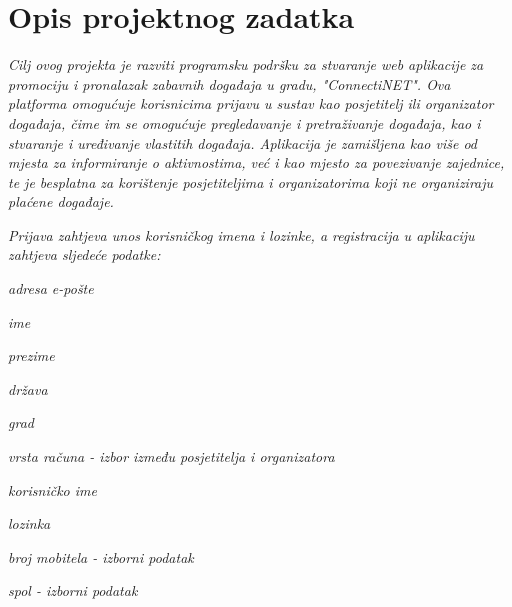 \chapter{Opis projektnog zadatka}
		
		
		
		\textit{Cilj ovog projekta je razviti programsku podršku za stvaranje web aplikacije za promociju i pronalazak zabavnih događaja u gradu, "ConnectiNET". Ova platforma omogućuje korisnicima prijavu u sustav kao posjetitelj ili organizator događaja, čime im se omogućuje pregledavanje i pretraživanje događaja, kao i stvaranje i uređivanje vlastitih događaja. Aplikacija je zamišljena kao više od mjesta za informiranje o aktivnostima, već i kao mjesto za povezivanje zajednice, te je besplatna za korištenje posjetiteljima i organizatorima koji ne organiziraju plaćene događaje.}
		
		\textit{Prijava zahtjeva unos korisničkog imena i lozinke, a registracija u aplikaciju zahtjeva sljedeće podatke:}
		 \begin{packed_item}
			\item \textit{adresa e-pošte}
		 	\item \textit{ime}
		 	\item \textit{prezime}
		 	\item \textit{država}
			\item \textit{grad}
			\item \textit{vrsta računa - izbor između posjetitelja i organizatora}
		 	\item \textit{korisničko ime}
		 	\item \textit{lozinka}
		 	\item \textit{broj mobitela - izborni podatak}
		 	\item \textit{spol - izborni podatak}
		 \end{packed_item}	

